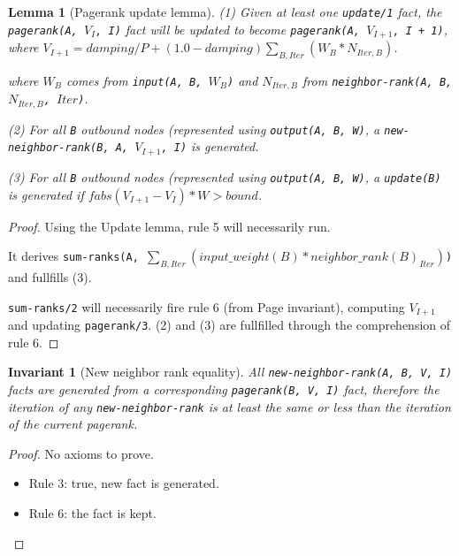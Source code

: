 \documentclass[9pt]{article}
\newtheorem{lemma}{Lemma}
\newtheorem{invariant}{Invariant}
\begin{document}
\begin{lemma}[Pagerank update lemma]
(1) Given at least one \texttt{update/1} fact, the \texttt{pagerank(A, $V_{I}$,
I)} fact will be updated to become \texttt{pagerank(A, $V_{I + 1}$, I +
1)}, where \texttt{$V_{I + 1} = damping / P + (1.0 - damping)\sum_{B,
Iter} (W_{B} * N_{Iter,B})$}.

where $W_B$ comes from \texttt{\bang input(A, B, $W_B$)}
and $N_{Iter,B}$ from \texttt{neighbor-rank(A, B, $N_{Iter, B}$, $Iter$)}.

(2) For all \texttt{B} outbound nodes (represented using \texttt{\bang output(A, B,
W)}, a \texttt{new-neighbor-rank(B, A, $V_{I+1}$, I)} is generated.

(3) For all \texttt{B} outbound nodes (represented using \texttt{\bang output(A, B,
W)}, a \texttt{update(B)} is generated if 
$fabs(V_{I + 1} - V_{I}) * W > bound$.
\end{lemma}
\begin{proof}
Using the Update lemma, rule 5 will necessarily run.

It derives \texttt{sum-ranks(A, $\sum_{B, Iter} (input\_weight(B) *
      neighbor\_rank(B)_{Iter})$)} and fullfills (3).

\texttt{sum-ranks/2} will necessarily fire rule 6 (from Page invariant),
computing $V_{I+1}$ and updating \texttt{pagerank/3}. (2) and (3) are fullfilled
through the comprehension of rule 6.
\end{proof}

\begin{invariant}[New neighbor rank equality]
All \texttt{new-neighbor-rank(A, B, V, I)} facts are generated from a corresponding
\texttt{pagerank(B, V, I)} fact, therefore the iteration of any
\texttt{new-neighbor-rank} is at least the same or less than the iteration of
the current pagerank.
\end{invariant}
\begin{proof}
No axioms to prove.

\begin{itemize}
   \item Rule 3: true, new fact is generated.
   \item Rule 6: the fact is kept.
\end{itemize}
\end{proof}
\end{document}
